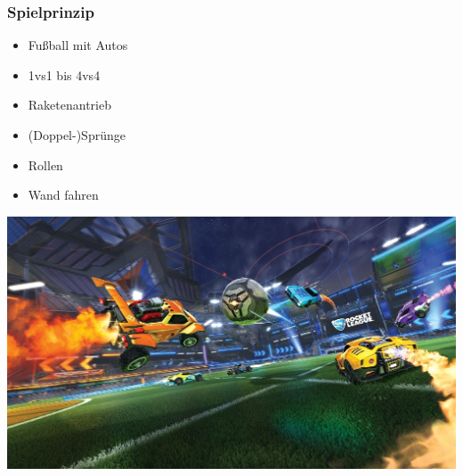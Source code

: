 \documentclass{beamer}
\begin{document}
 \begin{frame}
 \frametitle{Spielprinzip}
\begin{minipage}[c]{0.3\textwidth}
  \begin{itemize}
   \item Fußball mit Autos
   \item 1vs1 bis 4vs4
   \item Raketenantrieb
   \item (Doppel-)Sprünge
   \item Rollen
   \item Wand fahren
  \end{itemize}
\end{minipage}
\begin{minipage}[c]{0.68\textwidth}
 \includegraphics[width=\textwidth]{rocket_action.png}
\end{minipage}
 \end{frame}
\end{document}
